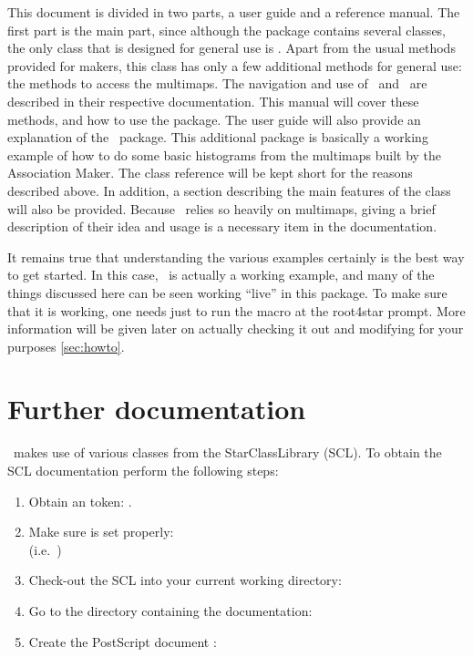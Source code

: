 This document is divided in two parts, a user guide and a
reference manual. The first part is the main part, since although
the package contains several classes, the only class that is designed
for general use is .  Apart from the usual
methods provided for makers, this class has only a few additional methods
for general use: the methods to access the multimaps.  The navigation and
use of \StEvent\ and \StMcEvent\ are described in their respective
documentation.
This manual will cover these methods, and how to
use the package.  The user guide will also provide an explanation of
the \StMcAnalysisMaker\ package.  This additional package is basically
a working example of how to do some basic histograms from the multimaps
built by the Association Maker.  The class reference will be kept short for the
reasons described above.
In addition, a section describing the main features of the  class
will also be provided.  Because \StAssociationMaker\ relies so heavily on
multimaps, giving a brief description of their idea and usage is
a necessary item in the documentation.

It remains true that understanding the various
examples certainly is the best way to get started. In this case,
\StMcAnalysisMaker\ is actually a working example, and many of the
things discussed here can be seen working ``live'' in this package.  To make
sure that it is working, one needs just to 
run the macro  at the root4star prompt.  
More information will be given
later on actually checking it out and modifying for your purposes \ref{sec:howto}.

\section{Further documentation}
\label{sec:furtherdoc}

\StAssociationMaker\ makes use of various classes from the StarClassLibrary (SCL).
To obtain the SCL documentation perform the following steps:
\begin{enumerate}
  \item Obtain an  token: .
  \item Make sure  is set properly: \\ %
	(i.e.~)
  \item Check-out the SCL into your current working directory:\\
  \item Go to the directory containing the documentation:\\
  \item Create the PostScript document :\\
\end{enumerate}
 

